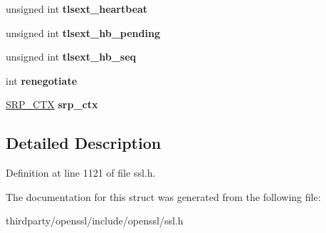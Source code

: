 \begin{DoxyCompactItemize}
unsigned int {\bfseries tlsext\+\_\+heartbeat}
\item 
\mbox{\label{structssl__st_a2abf4f35ea6d829b809e2c7c82acdd1f}} 
unsigned int {\bfseries tlsext\+\_\+hb\+\_\+pending}
\item 
\mbox{\label{structssl__st_af5db9aefebe8c45e8f063d2033b1bffd}} 
unsigned int {\bfseries tlsext\+\_\+hb\+\_\+seq}
\item 
\mbox{\label{structssl__st_a0a493dfdeb51c5c0a73107e0579e9601}} 
int {\bfseries renegotiate}
\item 
\mbox{\label{structssl__st_aaef9c47543427df406b33888d147f65d}} 
\hyperlink{structsrp__ctx__st}{S\+R\+P\+\_\+\+C\+TX} {\bfseries srp\+\_\+ctx}
\end{DoxyCompactItemize}


\subsection{Detailed Description}


Definition at line 1121 of file ssl.\+h.



The documentation for this struct was generated from the following file\+:\begin{DoxyCompactItemize}
\item 
thirdparty/openssl/include/openssl/ssl.\+h\end{DoxyCompactItemize}
